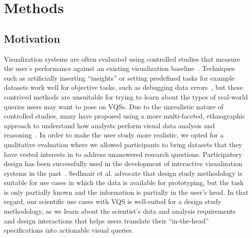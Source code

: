 \section{Methods\label{sec:methods}}
\subsection{Motivation}
\par Visualization systems are often evaluated using controlled studies that measure the user's performance against an existing visualization baseline~\cite{Plaisant2004}. Techniques such as artificially inserting ``insights'' or setting predefined tasks for example datasets work well for objective tasks, such as debugging data errors~\cite{kandel2011wrangler,Patel2010}, but these contrived methods are unsuitable for trying to learn about the types of real-world queries users may want to pose on VQSs. Due to the unrealistic nature of controlled studies, many have proposed using a more multi-faceted, ethnographic approach to understand how analysts perform visual data analysis and reasoning~\cite{Plaisant2004,lam2012empirical,shneiderman2006strategies,munzner2009nested,Sedlmair2012}. In order to make the user study more realistic, we opted for a qualitative evaluation where we allowed participants to bring datasets that they have vested interests in to address unanswered research questions. Participatory design has been successfully used in the development of interactive visualization systems in the past~\cite{Aragon2008,Chuang2012}. Sedlmair et al. \cite{Sedlmair2012} advocate that design study methodology is suitable for use cases in which the data is available for prototyping, but the task is only partially known and the information is partially in the user's head. In that regard, our scientific use cases with VQS is well-suited for a design study methodology, as we learn about the scientist's data and analysis requirements and design interactions that helps users translate their ``in-the-head'' specifications into actionable visual queries.
